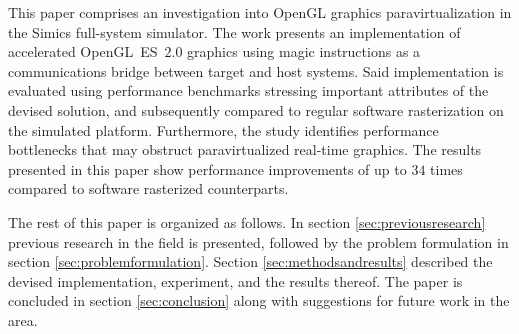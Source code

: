 This paper comprises an investigation into OpenGL graphics paravirtualization in the Simics full-system simulator.
The work presents an implementation of accelerated OpenGL~ES~$2.0$ graphics using magic instructions as a communications bridge between target and host systems.
Said implementation is evaluated using performance benchmarks stressing important attributes of the devised solution, and subsequently compared to regular software rasterization on the simulated platform.
Furthermore, the study identifies performance bottlenecks that may obstruct paravirtualized real-time graphics.
The results presented in this paper show performance improvements of up to $34$ times compared to software rasterized counterparts.

The rest of this paper is organized as follows.
In section \ref{sec:previousresearch} previous research in the field is presented, followed by the problem formulation in section \ref{sec:problemformulation}.
Section \ref{sec:methodsandresults} described the devised implementation, experiment, and the results thereof.
The paper is concluded in section \ref{sec:conclusion} along with suggestions for future work in the area.
